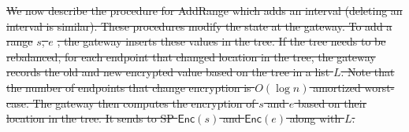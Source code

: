 \documentclass[letterpaper,twocolumn,10pt]{article}
\newcommand{\Enc}{\mathsf{Enc}}
\newcommand{\enc}{\Enc}
\newcommand{\en}{\mathsf{enc}}
\providecommand{\DIFdeltex}[1]{{\protect\color{red}\sout{#1}}}                      %
\providecommand{\DIFdelbegin}{} %
\providecommand{\DIFdelend}{} %
\providecommand{\DIFdel}[1]{\texorpdfstring{\DIFdeltex{#1}}{}} %
\begin{document}
\DIFdelbegin \DIFdel{We now describe the procedure for AddRange which adds an interval (deleting an interval is similar).
These procedures modify the state at the gateway.
To add a range }%
\DIFdel{$s$, $e$}%
\DIFdel{, the gateway inserts these values in the tree. 
If the tree needs to be rebalanced, for each endpoint that changed location in the tree, the gateway records the old and new encrypted value based
on the tree in a list $L$. Note that  the number of endpoints that change encryption is $O(\log n)$ amortized worst-case. 
The gateway then computes the encryption of $s$ and $e$ based on their location in the tree. 
It sends to SP $\enc(s)$ and $\enc(e)$ along with $L$. 
}\DIFdelend %


%
%
%
\end{document}
